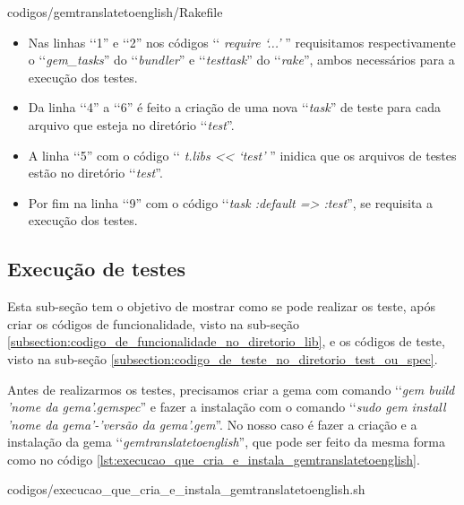 
{codigos/gemtranslatetoenglish/Rakefile}

\begin{itemize}

\item Nas linhas ‘‘1'' e ‘‘2'' nos códigos ‘‘ \emph{require ‘...'} '' requisitamos respectivamente o
 ‘‘\emph{gem\_tasks}'' do ‘‘\emph{bundler}'' e ‘‘\emph{testtask}'' do ‘‘\emph{rake}'', ambos necessários para
 a execução dos testes.

 \item Da linha ‘‘4'' a ‘‘6'' é feito a criação de uma nova ‘‘\emph{task}'' de teste para cada arquivo
 que esteja no diretório ‘‘\emph{test}''.

 \item A linha ‘‘5'' com o código ‘‘ \emph{t.libs << ‘test'} '' inidica que os arquivos de testes estão no
 diretório ‘‘\emph{test}''.

 \item Por fim na linha ‘‘9'' com o código ‘‘\emph{task :default => :test}'', se requisita a execução
 dos testes.

\end{itemize}


\subsection{Execução de testes}
\label{subsection:execução_de_testes}

Esta sub-seção tem o objetivo de mostrar como se pode realizar os teste, após criar os códigos de
funcionalidade, visto na sub-seção \ref{subsection:codigo_de_funcionalidade_no_diretorio_lib}, e os códigos
de teste, visto na sub-seção \ref{subsection:codigo_de_teste_no_diretorio_test_ou_spec}.

Antes de realizarmos os testes, precisamos criar a gema com comando ‘‘\emph{gem build 'nome da gema'.gemspec}''
e fazer a instalação com o comando ‘‘\emph{sudo gem install 'nome da gema'-'versão da gema'.gem}''. No nosso
caso é fazer a criação e a instalação da gema ‘‘\emph{gemtranslatetoenglish}'', que pode ser feito da mesma
forma como no código \ref{lst:execucao_que_cria_e_instala_gemtranslatetoenglish}.


{codigos/execucao_que_cria_e_instala_gemtranslatetoenglish.sh }

